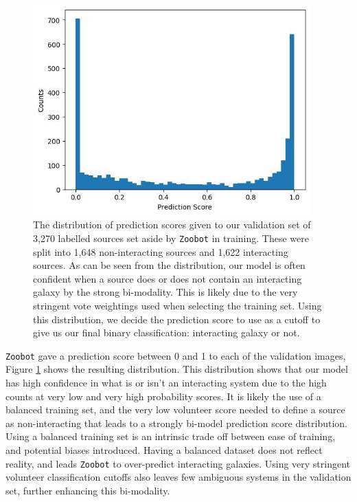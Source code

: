 \begin{figure}
  \centering
  \includegraphics[width = 0.95\textwidth]{Chapter2/figures/fig3.jpeg}
  \caption[The distribution of prediction scores given to our validation set of 3,270 labelled sources set aside by \texttt{Zoobot} in training.]{The distribution of prediction scores given to our validation set of 3,270 labelled sources set aside by \texttt{Zoobot} in training. These were split into 1,648 non-interacting sources and 1,622 interacting sources. As can be seen from the distribution, our model is often confident when a source does or does not contain an interacting galaxy by the strong bi-modality. This is likely due to the very stringent vote weightings used when selecting the training set. Using this distribution, we decide the prediction score to use as a cutoff to give us our final binary classification: interacting galaxy or not.}
  \label{fig:pred-score}
\end{figure}

\texttt{Zoobot} gave a prediction score between 0 and 1 to each of the validation images, Figure \ref{fig:pred-score} shows the resulting distribution. This distribution shows that our model has high confidence in what is or isn't an interacting system due to the high counts at very low and very high probability scores. It is likely the use of a balanced training set, and the very low volunteer score needed to define a source as non-interacting that leads to a strongly bi-model prediction score distribution. Using a balanced training set is an intrinsic trade off between ease of training, and potential biases introduced. Having a balanced dataset does not reflect reality, and leads \texttt{Zoobot} to over-predict interacting galaxies. Using very stringent volunteer classification cutoffs also leaves few ambiguous systems in the validation set, further enhancing this bi-modality.

